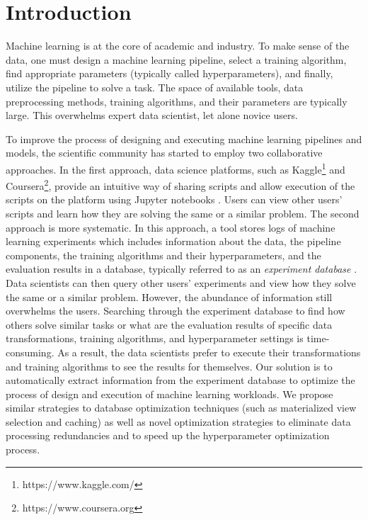 \section{Introduction} \label{sec-introduction}
Machine learning is at the core of academic and industry.
To make sense of the data, one must design a machine learning pipeline, select a training algorithm, find appropriate parameters (typically called hyperparameters), and finally, utilize the pipeline to solve a task.
The space of available tools, data preprocessing methods, training algorithms, and their parameters are typically large.
This overwhelms expert data scientist, let alone novice users.

To improve the process of designing and executing machine learning pipelines and models, the scientific community has started to employ two collaborative approaches.
In the first approach, data science platforms, such as Kaggle\footnote{https://www.kaggle.com/} and Coursera\footnote{https://www.coursera.org}, provide an intuitive way of sharing scripts and allow execution of the scripts on the platform using Jupyter notebooks \cite{Kluyver:2016aa}. 
Users can view other users' scripts and learn how they are solving the same or a similar problem.
The second approach is more systematic.
In this approach, a tool stores logs of machine learning experiments which includes information about the data, the pipeline components, the training algorithms and their hyperparameters, and the evaluation results in a database, typically referred to as an \textit{experiment database} \cite{Vanschoren2012}.
Data scientists can then query other users' experiments and view how they solve the same or a similar problem.
However, the abundance of information still overwhelms the users.
Searching through the experiment database to find how others solve similar tasks or what are the evaluation results of specific data transformations, training algorithms, and hyperparameter settings is time-consuming. 
As a result, the data scientists prefer to execute their transformations and training algorithms to see the results for themselves.
Our solution is to automatically extract information from the experiment database to optimize the process of design and execution of machine learning workloads.
We propose similar strategies to database optimization techniques (such as materialized view selection and caching) as well as novel optimization strategies to eliminate data processing redundancies and to speed up the hyperparameter optimization process.

